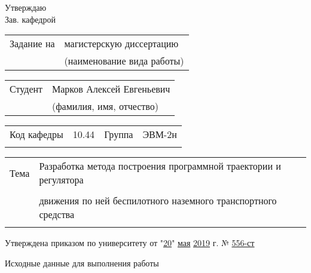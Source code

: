 \hfill
\begin{minipage}[t]{0.4\linewidth}
    Утверждаю \\
    Зав. кафедрой \\
      
\end{minipage}

\bigskip
\bigskip
\bigskip

\noindent
\begin{tabularx}{\linewidth}{@{}lY@{}}
	Задание на & магистерскую диссертацию \\
	& \footnotesize(наименование вида работы)\normalsize
\end{tabularx}

\noindent
\begin{tabularx}{\linewidth}{@{}lY@{}}
	Студент & Марков Алексей Евгеньевич \\
	& \footnotesize(фамилия, имя, отчество)\normalsize
\end{tabularx}


\noindent
\begin{tabularx}{\linewidth}{@{}lXlX@{}}
    Код кафедры & 10.44 & Группа & ЭВМ-2н \\
    \cline{2-2}\cline{4-4}\\
\end{tabularx}

\begin{nospasing}
\noindent
\begin{tabularx}{\linewidth}{@{}lX@{}}
    Тема & Разработка метода построения программной траектории и регулятора\\
           \cline{2-2}\\
         & движения по ней беспилотного наземного транспортного средства \\
         \cline{2-2}\\
\end{tabularx}
\end{nospasing}

\noindent
Утверждена приказом по университету от "\underline{20}" \underline{мая} \underline{2019} г. № \underline{556-ст}\\


\noindent
Исходные данные для выполнения работы \\
\underline{\hspace{\linewidth}} \\
\underline{\hspace{\linewidth}} \\
\underline{\hspace{\linewidth}} \\
\underline{\hspace{\linewidth}} \\

